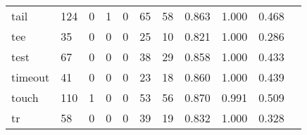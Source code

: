 \begin{longtable}{lp{1.2cm}p{1.2cm}p{1.2cm}p{1.2cm}p{1.2cm}p{1.2cm}p{1.2cm}p{1.2cm}p{1.2cm}p{1.2cm}}
tail      &                                   124 &                                                  0 &                                                  1 &                                                  0 &                                                 65 &                                                 58 &                                         0.863 &                                              1.000 &                                              0.468 \\
tee       &                                    35 &                                                  0 &                                                  0 &                                                  0 &                                                 25 &                                                 10 &                                         0.821 &                                              1.000 &                                              0.286 \\
test      &                                    67 &                                                  0 &                                                  0 &                                                  0 &                                                 38 &                                                 29 &                                         0.858 &                                              1.000 &                                              0.433 \\
timeout   &                                    41 &                                                  0 &                                                  0 &                                                  0 &                                                 23 &                                                 18 &                                         0.860 &                                              1.000 &                                              0.439 \\
touch     &                                   110 &                                                  1 &                                                  0 &                                                  0 &                                                 53 &                                                 56 &                                         0.870 &                                              0.991 &                                              0.509 \\
tr        &                                    58 &                                                  0 &                                                  0 &                                                  0 &                                                 39 &                                                 19 &                                         0.832 &                                              1.000 &                                              0.328 \\

\end{longtable}
